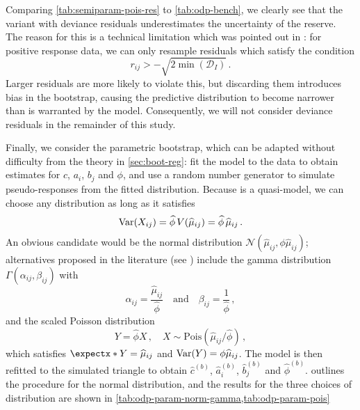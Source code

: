\documentclass[a4paper]{book}
\begin{document}
Comparing \cref{tab:semiparam-pois-res} to \cref{tab:odp-bench}, we clearly see that the variant with deviance residuals underestimates the uncertainty of the reserve. The reason for this is a technical limitation which was pointed out in \cite[13-14]{hartl}: for positive response data, we can only resample residuals which satisfy the condition
\begin{equation}
  r_{ij} > -\sqrt{2 \min({\mathcal{D}_I})} \,.
\end{equation}
Larger residuals are more likely to violate this, but discarding them introduces bias in the bootstrap, causing the predictive distribution to become narrower than is warranted by the model. Consequently, we will not consider deviance residuals in the remainder of this study.

Finally, we consider the parametric bootstrap, which can be adapted without difficulty from the theory in \cref{sec:boot-reg}: fit the model to the data to obtain estimates for $c$, $a_i$, $b_j$ and $\phi$, and use a random number generator to simulate pseudo-responses from the fitted distribution. Because  is a quasi-model, we can choose any distribution as long as it satisfies
\begin{equation}
  \var{X_{ij}} = \widehat{\phi} \, V(\widehat{\mu}_{ij}) = \widehat{\phi} \, \widehat{\mu}_{ij} \,.
\end{equation}
An obvious candidate would be the normal distribution $\mathcal{N}(\widehat{\mu}_{ij}, \phi \widehat{\mu}_{ij})$; alternatives proposed in the literature (see \cite{england:add-anal-boot-est}) include the gamma distribution $\Gamma(\alpha_{ij}, \beta_{ij})$ with
\begin{equation}
  \alpha_{ij} = \frac{\widehat{\mu}_{ij}}{\widehat{\phi}} \quad \text{and} \quad \beta_{ij} = \frac{1}{\widehat{\phi}} \,,
\end{equation}
and the scaled Poisson distribution
\begin{equation}
  Y = \widehat{\phi} X \,, \quad X \sim \mathrm{Pois}(\widehat{\mu}_{ij} / \widehat{\phi}) \,,
\end{equation}
which satisfies $\expect{Y} = \widehat{\mu}_{ij}$ and $\var{Y} = \phi \widehat{\mu}_{ij}$.
The model is then refitted to the simulated triangle to obtain $\widehat{c}^{(b)}$, $\widehat{a}^{(b)}_i$, $\widehat{b}^{(b)}_j$ and $\widehat{\phi}^{(b)}$.  outlines the procedure for the normal distribution, and the results for the three choices of distribution are shown in \cref{tab:odp-param-norm-gamma,tab:odp-param-pois}
\end{document}
